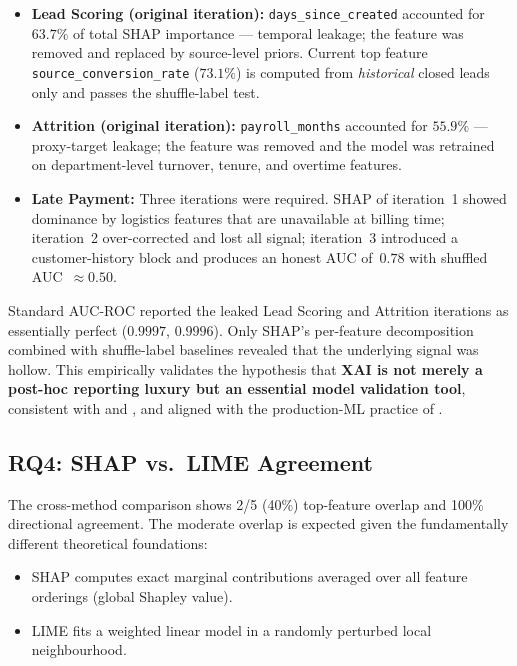 \documentclass[12pt,a4paper]{report}
\begin{document}
\begin{itemize}
  \item \textbf{Lead Scoring (original iteration):} \texttt{days\_since\_created} accounted for $63.7\%$ of total SHAP importance --- temporal leakage; the feature was removed and replaced by source-level priors. Current top feature \texttt{source\_conversion\_rate} ($73.1\%$) is computed from \emph{historical} closed leads only and passes the shuffle-label test.
  \item \textbf{Attrition (original iteration):} \texttt{payroll\_months} accounted for $55.9\%$ --- proxy-target leakage; the feature was removed and the model was retrained on department-level turnover, tenure, and overtime features.
  \item \textbf{Late Payment:} Three iterations were required. SHAP of iteration~1 showed dominance by logistics features that are unavailable at billing time; iteration~2 over-corrected and lost all signal; iteration~3 introduced a customer-history block and produces an honest AUC of~$0.78$ with shuffled AUC~$\approx 0.50$.
\end{itemize}

Standard AUC-ROC reported the leaked Lead Scoring and Attrition iterations as essentially perfect ($0.9997$, $0.9996$). Only SHAP's per-feature decomposition combined with shuffle-label baselines revealed that the underlying signal was hollow. This empirically validates the hypothesis that \textbf{XAI is not merely a post-hoc reporting luxury but an essential model validation tool}, consistent with \citet{lundberg2020local} and \citet{molnar2022interpretable}, and aligned with the production-ML practice of \citet{breck2017mltest}.

\subsection{RQ4: SHAP vs.\ LIME Agreement}

The cross-method comparison shows 2/5 (40\%) top-feature overlap and 100\% directional agreement. The moderate overlap is expected given the fundamentally different theoretical foundations:

\begin{itemize}
  \item SHAP computes exact marginal contributions averaged over all feature orderings (global Shapley value).
  \item LIME fits a weighted linear model in a randomly perturbed local neighbourhood.
\end{itemize}
\end{document}
